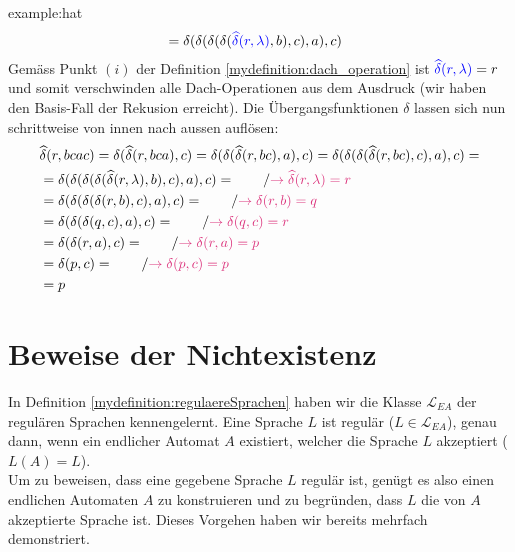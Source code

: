 \begin{example}{example:hat}
\begin{align*}
		 & = \delta(\delta(\delta(\delta(\textcolor{blue}{\widehat{\delta}(r,\lambda)},b),c),a),c)
	\end{align*}
	Gemäss Punkt $(i)$ der Definition \cref{mydefinition:dach_operation} ist $\textcolor{blue}{\widehat{\delta}(r,\lambda)} = r$  und somit verschwinden alle Dach-Operationen aus dem Ausdruck (wir haben den Basis-Fall der Rekusion erreicht). Die Übergangsfunktionen $\delta$ lassen sich nun schrittweise von innen nach aussen auflösen:
	\begin{align*}
		 & \deltah{r}{bcac} = \delta(\deltah{r}{bca},c) = \delta(\delta(\deltah{r}{bc},a),c) = \delta(\delta(\delta(\deltah{r}{bc},c),a),c) = \\
		 & = \delta(\delta(\delta(\delta(\deltah{r}{\lambda},b),c),a),c) = \quad\quad / \pinkone{\to \deltah{r}{\lambda} = r}                 \\
		 & = \delta(\delta(\delta(\delta(r,b),c),a),c) = \quad\quad / \pinkone{\to \delta(r,b) = q}                                           \\
		 & = \delta(\delta(\delta(q,c),a),c) = \quad\quad / \pinkone{\to \delta(q,c) = r}                                                     \\
		 & = \delta(\delta(r,a),c) = \quad\quad / \pinkone{\to \delta(r,a) = p}                                                               \\
		 & = \delta(p,c) = \quad\quad / \pinkone{\to \delta(p,c) = p}                                                                         \\
		 & = p
	\end{align*}
\end{example}

\clearpage
\section{Beweise der Nichtexistenz}
In Definition \cref{mydefinition:regulaereSprachen} haben wir die Klasse $\mathcal{L}_{EA}$ der regulären Sprachen kennengelernt. Eine Sprache $L$ ist regulär ($L\in\mathcal{L}_{EA}$), genau dann, wenn ein endlicher Automat $A$ existiert, welcher die Sprache $L$ akzeptiert ($L(A) = L$).\\
Um zu beweisen, dass eine gegebene Sprache $L$ regulär ist, genügt es also einen endlichen Automaten $A$ zu konstruieren und zu begründen, dass $L$ die von $A$ akzeptierte Sprache ist. Dieses Vorgehen haben wir bereits mehrfach demonstriert.\\

